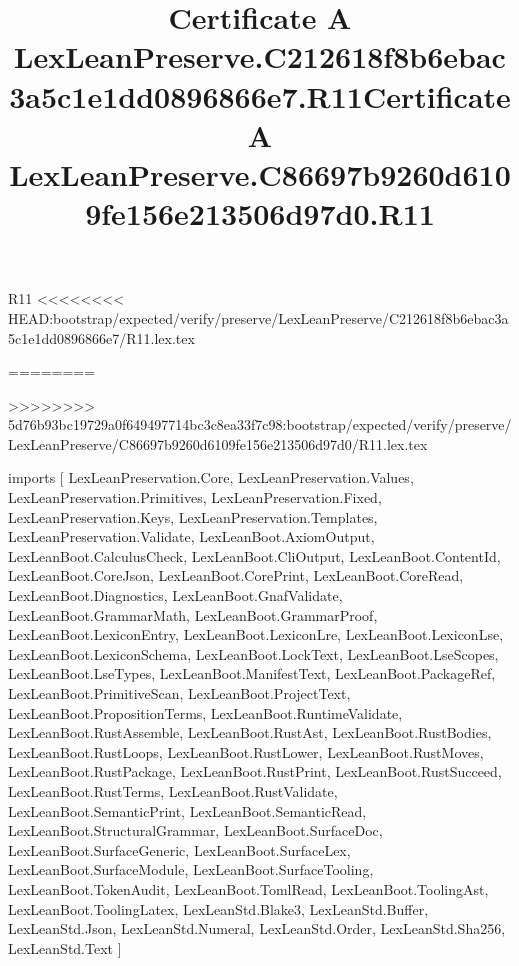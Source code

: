 \begin{lexlean}{R11}
<<<<<<<< HEAD:bootstrap/expected/verify/preserve/LexLeanPreserve/C212618f8b6ebac3a5c1e1dd0896866e7/R11.lex.tex
\title{Certificate A LexLeanPreserve.C212618f8b6ebac3a5c1e1dd0896866e7.R11}
========
\title{Certificate A LexLeanPreserve.C86697b9260d6109fe156e213506d97d0.R11}
>>>>>>>> 5d76b93bc19729a0f649497714bc3c8ea33f7c98:bootstrap/expected/verify/preserve/LexLeanPreserve/C86697b9260d6109fe156e213506d97d0/R11.lex.tex
\begin{coremodule}
imports [
  LexLeanPreservation.Core,
  LexLeanPreservation.Values,
  LexLeanPreservation.Primitives,
  LexLeanPreservation.Fixed,
  LexLeanPreservation.Keys,
  LexLeanPreservation.Templates,
  LexLeanPreservation.Validate,
  LexLeanBoot.AxiomOutput,
  LexLeanBoot.CalculusCheck,
  LexLeanBoot.CliOutput,
  LexLeanBoot.ContentId,
  LexLeanBoot.CoreJson,
  LexLeanBoot.CorePrint,
  LexLeanBoot.CoreRead,
  LexLeanBoot.Diagnostics,
  LexLeanBoot.GnafValidate,
  LexLeanBoot.GrammarMath,
  LexLeanBoot.GrammarProof,
  LexLeanBoot.LexiconEntry,
  LexLeanBoot.LexiconLre,
  LexLeanBoot.LexiconLse,
  LexLeanBoot.LexiconSchema,
  LexLeanBoot.LockText,
  LexLeanBoot.LseScopes,
  LexLeanBoot.LseTypes,
  LexLeanBoot.ManifestText,
  LexLeanBoot.PackageRef,
  LexLeanBoot.PrimitiveScan,
  LexLeanBoot.ProjectText,
  LexLeanBoot.PropositionTerms,
  LexLeanBoot.RuntimeValidate,
  LexLeanBoot.RustAssemble,
  LexLeanBoot.RustAst,
  LexLeanBoot.RustBodies,
  LexLeanBoot.RustLoops,
  LexLeanBoot.RustLower,
  LexLeanBoot.RustMoves,
  LexLeanBoot.RustPackage,
  LexLeanBoot.RustPrint,
  LexLeanBoot.RustSucceed,
  LexLeanBoot.RustTerms,
  LexLeanBoot.RustValidate,
  LexLeanBoot.SemanticPrint,
  LexLeanBoot.SemanticRead,
  LexLeanBoot.StructuralGrammar,
  LexLeanBoot.SurfaceDoc,
  LexLeanBoot.SurfaceGeneric,
  LexLeanBoot.SurfaceLex,
  LexLeanBoot.SurfaceModule,
  LexLeanBoot.SurfaceTooling,
  LexLeanBoot.TokenAudit,
  LexLeanBoot.TomlRead,
  LexLeanBoot.ToolingAst,
  LexLeanBoot.ToolingLatex,
  LexLeanStd.Blake3,
  LexLeanStd.Buffer,
  LexLeanStd.Json,
  LexLeanStd.Numeral,
  LexLeanStd.Order,
  LexLeanStd.Sha256,
  LexLeanStd.Text
]


\end{coremodule}
\end{lexlean}
